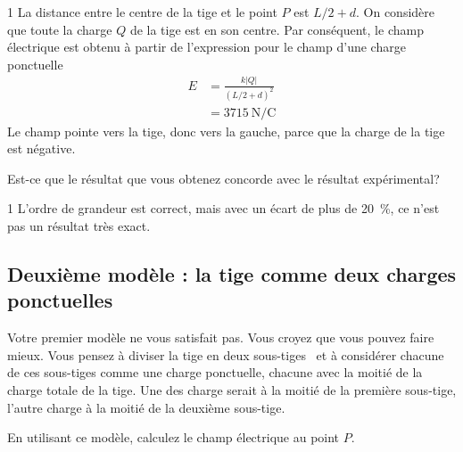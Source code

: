 \documentclass{tufte-handout}
\newcommand{\abs}[1]{\left| #1 \right|}
\def\reponse{1}
\begin{document}
\if\reponse1
  {\color{tblue}
  La distance entre le centre de la tige et le point $P$ est $L/2 + d$. On
  considère que toute la charge $Q$ de la tige est en son centre. Par
  conséquent, le champ électrique est obtenu à partir de l'expression pour le
  champ d'une charge ponctuelle
  \begin{align*}
    E &= \frac{k\abs{Q}}{\left(L/2 + d\right)^2}  \\
      &= \SI{3715}{\newton\per\coulomb}
  \end{align*}
  Le champ pointe vers la tige, donc vers la gauche, parce que la charge de la
  tige est négative.
  }
\else
  \vspace{5cm}
\fi


Est-ce que le résultat que vous obtenez concorde avec le résultat expérimental?

\if\reponse1
  {\color{tblue}
  L'ordre de grandeur est correct, mais avec un écart de plus de
  \SI{20}{\percent}, ce n'est pas un résultat très exact.
  }
\else
\vspace{5cm}
\fi



\subsection{Deuxième modèle : la tige comme deux charges ponctuelles}

Votre premier modèle ne vous satisfait pas. Vous croyez que vous pouvez faire
mieux. Vous pensez à diviser la tige en deux \og sous-tiges \fg\ et à
considérer chacune de ces sous-tiges comme une charge ponctuelle, chacune avec
la moitié de la charge totale de la tige. Une des charge serait à la moitié de
la première sous-tige, l'autre charge à la moitié de la deuxième sous-tige.
\begin{marginfigure}
\end{marginfigure}
En utilisant ce modèle, calculez le champ électrique au point $P$.
\end{document}
